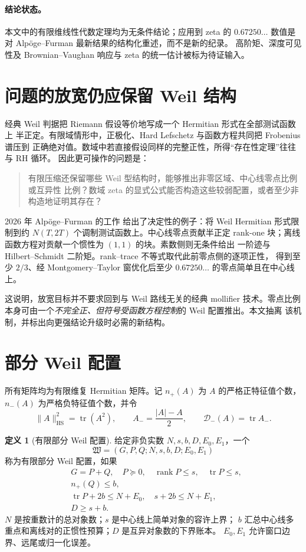 \documentclass[UTF8,11pt,a4paper]{ctexart}
\theoremstyle{definition}
\newtheorem{definition}[theorem]{定义}
\theoremstyle{remark}
\newcommand{\tr}{\operatorname{tr}}
\newcommand{\rank}{\operatorname{rank}}
\newcommand{\HS}{\mathrm{HS}}
\newcommand{\cW}{\mathfrak W}
\begin{document}
\paragraph{结论状态。}
本文中的有限维线性代数定理均为无条件结论；应用到 zeta 的
$0.67250\ldots$ 数值是对 Alpöge--Furman 最新结果的结构化重述，而不是新的纪录。
高阶矩、深度可见性及 Brownian--Vaughan 响应与 zeta 的统一估计被标为待证输入。

\section{问题的放宽仍应保留 Weil 结构}

经典 Weil 判据把 Riemann 假设等价地写成一个 Hermitian 形式在全部测试函数上
半正定。有限域情形中，正极化、Hard Lefschetz 与函数方程共同把 Frobenius 谱压到
正确绝对值。数域中若直接假设同样的完整正性，所得“存在性定理”往往与 RH 循环。
因此更可操作的问题是：
\begin{quote}
有限压缩还保留哪些 Weil 型结构时，能够推出非零区域、中心线零点比例或互异性
比例？数域 zeta 的显式公式能否构造这些较弱配置，或者至少非构造地证明其存在？
\end{quote}

2026 年 Alpöge--Furman 的工作 \cite{AF26} 给出了决定性的例子：将 Weil
Hermitian 形式限制到约 $N(T,2T)$ 个调制测试函数上。中心线零点贡献半正定
rank-one 块；离线函数方程对贡献一个惯性为 $(1,1)$ 的块。素数侧则无条件给出
一阶迹与 Hilbert--Schmidt 二阶矩。rank--trace 不等式取代此前零点侧的逐项正性，
得到至少 $2/3$、经 Montgomery--Taylor 窗优化后至少 $0.67250\ldots$
的零点简单且在中心线上。

这说明，放宽目标并不要求回到与 Weil 路线无关的经典 mollifier 技术。零点比例
本身可由一个\emph{不完全正、但符号受函数方程控制}的 Weil 配置推出。本文抽离
该机制，并标出向更强结论升级时必需的新结构。

\section{部分 Weil 配置}

所有矩阵均为有限维复 Hermitian 矩阵。记 $n_+(A)$ 为 $A$ 的严格正特征值个数，
$n_-(A)$ 为严格负特征值个数，并令
\[
 \|A\|_{\HS}^2=\tr(A^2),\qquad
 A_-=\frac{|A|-A}{2},\qquad \mathcal{D}_-(A)=\tr A_-.
\]

\begin{definition}[有限部分 Weil 配置]
给定非负实数 $N,s,b,D,E_0,E_1$，一个
\[
 \cW=(G,P,Q;N,s,b,D;E_0,E_1)
\]
称为有限部分 Weil 配置，如果
\begin{align}
 &G=P+Q,\quad P\succeq0,\quad \rank P\le s,\quad \tr P\le s, \label{eq:pw1}\\
 &n_+(Q)\le b, \label{eq:pw2}\\
 &\tr P+2b\le N+E_0,\quad s+2b\le N+E_1, \label{eq:pw3}\\
 &D\ge s+b. \label{eq:pw4}
\end{align}
$N$ 是按重数计的总对象数；$s$ 是中心线上简单对象的容许上界；
$b$ 汇总中心线多重点和离线对的正惯性预算；$D$ 是互异对象数的下界账本。
$E_0,E_1$ 允许窗口边界、远尾或归一化误差。
\end{definition}
\end{document}
